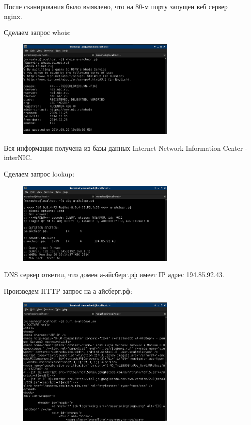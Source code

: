 \documentclass[russian,utf8,emptystyle]{eskdtext}
\begin{document}
После сканирования было выявлено, что на 80-м порту запущен веб сервер nginx.

Сделаем запрос whois:
\begin{figure}[h!]
\centering
\includegraphics[width=0.7\textwidth]{009}
\end{figure}
Вся информация получена из базы данных Internet Network Information Center - interNIC.

Сделаем запрос lookup:
\begin{figure}[h!]
\centering
\includegraphics[width=0.7\textwidth]{010}
\end{figure}
DNS сервер ответил, что домен а-айсберг.рф имеет IP адрес 194.85.92.43.

Произведем HTTP запрос на а-айсберг.рф:
\begin{figure}[h!]
\centering
\includegraphics[width=0.7\textwidth]{011}
\end{figure}
\clearpage
\end{document}

